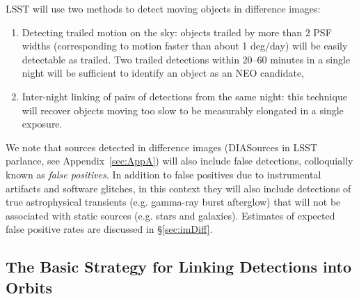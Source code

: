LSST will use two methods to detect moving objects in difference images: 
\begin{enumerate}
\item Detecting trailed motion on the sky: objects trailed by more
  than 2 PSF widths (corresponding to motion faster than about 1
  deg/day) will be easily detectable as trailed.  Two trailed
  detections within 20--60 minutes in a single night will be
  sufficient to identify an object as an NEO candidate,
\item Inter-night linking of pairs of detections from the same night: this technique will 
  recover objects moving too slow to be measurably elongated in a single exposure. 
\end{enumerate} 

We note that sources detected in difference images (DIASources in LSST parlance, see Appendix~\ref{sec:AppA})
will also include false detections, colloquially known as {\it false positives}. 
In addition to false positives due to instrumental artifacts and software glitches, 
in this context they will also include detections of true astrophysical transients 
(e.g. gamma-ray burst afterglow) that will not be associated with static sources
(e.g. stars and galaxies). Estimates of expected false positive rates are discussed
in \S\ref{sec:imDiff}. 



\subsection{The Basic Strategy for Linking Detections into Orbits} 


